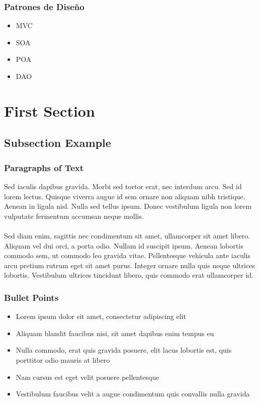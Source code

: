 \documentclass{beamer}
\begin{document}

\begin{frame}
\frametitle{Patrones de Diseño}
\begin{itemize}
\item MVC
\item SOA
\item POA
\item DAO
\end{itemize}
\end{frame}

\section{First Section} %

\subsection{Subsection Example} %

\begin{frame}
\frametitle{Paragraphs of Text}
Sed iaculis dapibus gravida. Morbi sed tortor erat, nec interdum arcu. Sed id lorem lectus. Quisque viverra augue id sem ornare non aliquam nibh tristique. Aenean in ligula nisl. Nulla sed tellus ipsum. Donec vestibulum ligula non lorem vulputate fermentum accumsan neque mollis.\\~\\

Sed diam enim, sagittis nec condimentum sit amet, ullamcorper sit amet libero. Aliquam vel dui orci, a porta odio. Nullam id suscipit ipsum. Aenean lobortis commodo sem, ut commodo leo gravida vitae. Pellentesque vehicula ante iaculis arcu pretium rutrum eget sit amet purus. Integer ornare nulla quis neque ultrices lobortis. Vestibulum ultrices tincidunt libero, quis commodo erat ullamcorper id.
\end{frame}


\begin{frame}
\frametitle{Bullet Points}
\begin{itemize}
\item Lorem ipsum dolor sit amet, consectetur adipiscing elit
\item Aliquam blandit faucibus nisi, sit amet dapibus enim tempus eu
\item Nulla commodo, erat quis gravida posuere, elit lacus lobortis est, quis porttitor odio mauris at libero
\item Nam cursus est eget velit posuere pellentesque
\item Vestibulum faucibus velit a augue condimentum quis convallis nulla gravida
\end{itemize}
\end{frame}
\end{document}
